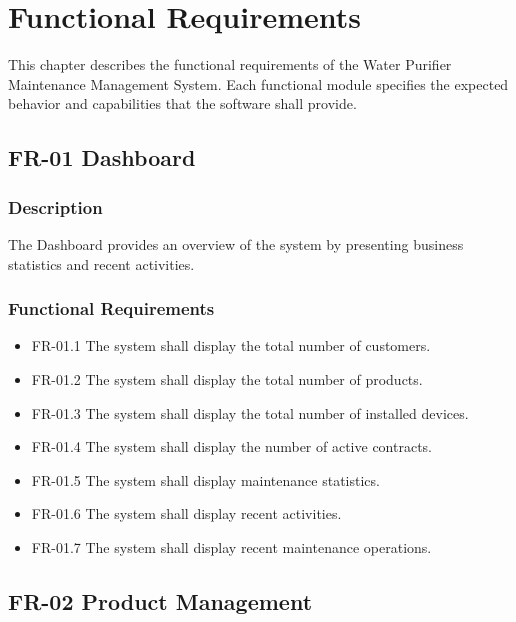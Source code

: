 \chapter{Functional Requirements}

This chapter describes the functional requirements of the Water Purifier Maintenance Management System. Each functional module specifies the expected behavior and capabilities that the software shall provide.

\section{FR-01 Dashboard}

\subsection*{Description}

The Dashboard provides an overview of the system by presenting business statistics and recent activities.

\subsection*{Functional Requirements}

\begin{itemize}
    \item FR-01.1 The system shall display the total number of customers.
    \item FR-01.2 The system shall display the total number of products.
    \item FR-01.3 The system shall display the total number of installed devices.
    \item FR-01.4 The system shall display the number of active contracts.
    \item FR-01.5 The system shall display maintenance statistics.
    \item FR-01.6 The system shall display recent activities.
    \item FR-01.7 The system shall display recent maintenance operations.
\end{itemize}

\section{FR-02 Product Management}

